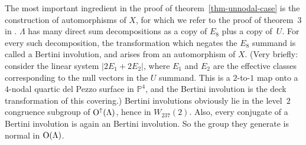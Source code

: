 \documentclass[12pt]{amsart}
\def\P{\mathbb{P}}
\def\Orth{{\rm O}}
\def\Oup{\Orth^{\uparrow}}
\numberwithin{theorem}{section}
\numberwithin{equation}{section}
\numberwithin{figure}{section}
\theoremstyle{remark}
\begin{document}
The most important ingredient in the proof of
theorem~\ref{thm-unnodal-case} is the construction of automorphisms of
$X$, for which we refer to the proof of theorem~$3$ in
\cite[\S6]{Dolgachev-introduction-to-Enriques-surfaces}.  $\Lambda$
has many direct sum decompositions as a copy of $E_8$ plus a copy
of~$U$.  For every such decomposition, the transformation which
negates the $E_8$ summand is called a Bertini involution, and arises
from an automorphism of $X$.
(Very briefly: consider the linear system $|2E_1+2E_2|$, where $E_1$
and $E_2$ are the effective classes corresponding to the null vectors
in the $U$ summand.  This is a $2$-to-$1$ map onto a $4$-nodal quartic
del Pezzo surface in $\P^4$, and the Bertini involution is the deck
transformation of this covering.)
Bertini involutions obviously lie in the
level~$2$ congruence subgroup of $\Oup(\Lambda)$, hence in
$W_{237}(2)$.  Also, every conjugate of a Bertini involution is again
an Bertini involution.  So the group they generate is normal in
$\Orth(\Lambda)$.
\end{document}
